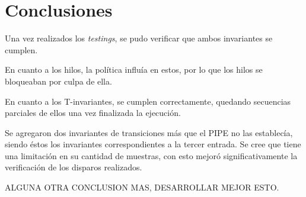 \documentclass[12pt,a4paper]{article}
\begin{document}
\section{Conclusiones}
Una vez realizados los \emph{testings}, se pudo verificar que ambos invariantes se cumplen.

En cuanto a los hilos, la política influía en estos, por lo que los hilos se bloqueaban por culpa de ella.

En cuanto a los T-invariantes, se cumplen correctamente, quedando secuencias parciales de ellos una vez finalizada la ejecución.

Se agregaron dos invariantes de transiciones más que el PIPE no las establecía, siendo éstos los invariantes correspondientes a la tercer entrada. Se cree que tiene una limitación en su cantidad de muestras, con esto mejoró significativamente la verificación de los disparos realizados.

ALGUNA OTRA CONCLUSION MAS, DESARROLLAR MEJOR ESTO.
\end{document}
